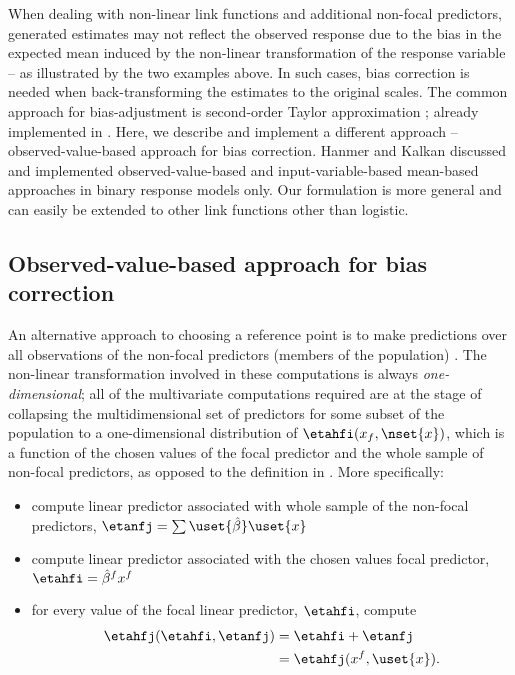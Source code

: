 
When dealing with non-linear link functions and additional non-focal predictors,  generated estimates may not reflect the observed response due to the bias in the expected mean induced by the non-linear transformation of the response variable -- as illustrated by the two examples above. In such cases, bias correction is needed when back-transforming the estimates to the original scales. The common approach for bias-adjustment is second-order Taylor approximation \citep{duursma2003bias, hanmer2013behind}; already implemented in  \citep{lenth2018package}. Here, we describe and implement a different approach -- observed-value-based approach for bias correction. Hanmer and Kalkan \citep{hanmer2013behind} discussed and implemented observed-value-based and input-variable-based mean-based approaches in binary response models only. Our formulation is more general and can easily be extended to other link functions other than logistic. 


\subsection{Observed-value-based approach for bias correction}

An alternative approach to choosing a reference point is to make predictions over all observations of the non-focal predictors (members of the population) \citep{hanmer2013behind}. The non-linear transformation involved in these computations is always \emph{one-dimensional}; all of the multivariate computations required are at the stage of collapsing the multidimensional set of predictors for some subset of the population to a one-dimensional distribution of $\etahfi(x_f, \nset{x})$, which is a function of the chosen values of the focal predictor and the whole sample of non-focal predictors, as opposed to the definition in . More specifically:
\begin{itemize}
\item compute linear predictor associated with whole sample of the non-focal predictors, $\etanfj = \sum \uset{\hat{\beta}} \uset{x}$
\item compute linear predictor associated with the chosen values focal predictor, $\etahfi = \hat{\beta}^f x^f$
\item for every value of the focal linear predictor, $\etahfi$, compute
%
\begin{align}\label{eq:pop_eta} 
\etahfj(\etahfi, \etanfj)  &= \etahfi + \etanfj \nonumber \\
&= \etahfj(x^f, \uset{x}).
\end{align}
\end{itemize}
%

